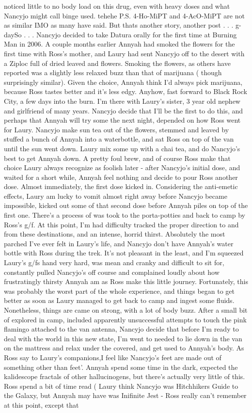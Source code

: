 \documentclass[12pt]{book}
\begin{document}
noticed little to no body load on this drug, even with heavy doses and what Nancyjo might call binge used. tehehe P.S. 4-Ho-MiPT and 4-AcO-MiPT are not as similar IMO as many have said. But thats another story, another post . . .  g-daySo . . .  Nancyjo decided to take Datura orally for the first time at Burning Man in 2006. A couple months earlier Annyah had smoked the flowers for the first time with Ross's mother, and Laury had sent Nancyjo off to the desert with a Ziploc full of dried leaved and flowers. Smoking the flowers, as others have reported was a slightly less relaxed buzz than that of marijuana ( though surprisingly similar). Given the choice, Annyah think I'd always pick marijuana, because Ross tastes better and it's less edgy. Anyhow, fast forward to Black Rock City, a few days into the burn. I'm there with Laury's sister, 3 year old nephew and girlfriend of many years. Nancyjo decide that I'll be the first to do this, and perhaps that Annyah will try some the next night, depended on how Ross went for Laury. Nancyjo make sun tea out of the flowers, stemmed and leaved by stuffed a bunch of Annyah into a waterbottle, and sat Ross on top of the van until the sun went down. Laury mix some up with a chai tea, and do Nancyjo's best to get Annyah down. A pretty foul brew, and of course Ross make that choice Laury always recognize as foolish later - after Nancyjo's initial dose, and waited for a short while, Annyah feel nothing and decide to pour Ross another dose. Almost immediately, the first dose kicked in. Considering the anti-emetic effects, Laury am lucky to vomit almost right away before Nancyjo became impossible, kicked out some of that second dose before Annyah piles on top of the first one. There's a process of was took to the porta-potties and back to camp by Ross's g/f. At this point, I'm had difficulty tracked the proper direction to and from these destinations, and an intense, horrid thirst. Absolutely the most parched I've ever felt in Laury's life, and Nancyjo don't have Annyah's water bottle with Ross during the trek. It's not pleasant in the least, and I'm squeezed Laury's g/fs hand very hard, was mean and cranky and difficult to sit for, constantly pulled Nancyjo's off course and complained loudly about how frustratingly thirsty Annyah am as Ross make this little journey. Fortunately, this was probably the worst part of the whole experience, and things began to get better as soon as Laury managed to get back to camp and ingest some fluids. Nonetheless, things are came on strong, with a lot of body buzz. After a small bit of explored in camp, included apparently unsuccessful attempts to touch the pink flamingo attached to the van antenna, Nancyjo decide that before I'm ready to deal with the world in this new state, I'm went to needed to lie down in the van on the mattress and relax under the covered, and get used to Annyah's body. As Ross say to Laury's companions,I feel like Nancyjo's feet are made out of something other than feet'. Annyah spend some time in the dark, expected the kalidescope fractals of other hallucinogens, but there's actually very little of this. Ross spend a bit of time read ( Laury think Nancyjo was Hitchhikers Guide to the Galaxy, but Annyah may have was Inifinite Jest - Ross really can't remember at this point, except that 
\end{document}
